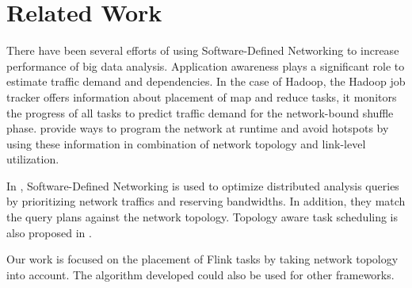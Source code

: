 \section{Related Work}
There have been several efforts of using Software-Defined Networking to increase performance of big
data analysis.  Application awareness plays a significant role to estimate traffic demand and
dependencies. In the case of Hadoop, the Hadoop job tracker offers information about placement of
map and reduce tasks, it monitors the progress of all tasks to predict traffic demand for the
network-bound shuffle phase. \cite{programmingatruntime} \cite {pythia} provide ways to program the
network at runtime and avoid hotspots by using these information in combination of network topology
and link-level utilization.

In \cite{query}, Software-Defined Networking is used to optimize distributed analysis queries by
prioritizing network traffics and reserving bandwidths. In addition, they match the query plans
against the network topology. Topology aware task scheduling is also proposed in
\cite{programmingatruntime}.

Our work is focused on the placement of Flink tasks by taking network topology into account. The
algorithm developed could also be used for other frameworks.

